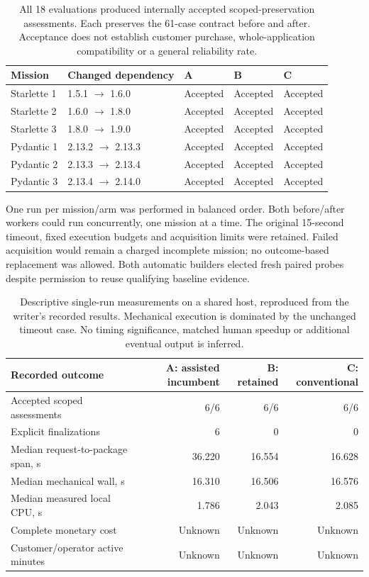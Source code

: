 \documentclass[11pt,letterpaper]{article}
\begin{document}
\begin{table}[ht]
\centering\small
\begin{tabularx}{\linewidth}{@{}lYlll@{}}
\toprule
Mission & Changed dependency & A & B & C\\\midrule
Starlette 1 & 1.5.1 $\to$ 1.6.0 & Accepted & Accepted & Accepted\\
Starlette 2 & 1.6.0 $\to$ 1.8.0 & Accepted & Accepted & Accepted\\
Starlette 3 & 1.8.0 $\to$ 1.9.0 & Accepted & Accepted & Accepted\\
Pydantic 1 & 2.13.2 $\to$ 2.13.3 & Accepted & Accepted & Accepted\\
Pydantic 2 & 2.13.3 $\to$ 2.13.4 & Accepted & Accepted & Accepted\\
Pydantic 3 & 2.13.4 $\to$ 2.14.0 & Accepted & Accepted & Accepted\\
\bottomrule
\end{tabularx}
\caption{All 18 evaluations produced internally accepted scoped-preservation assessments. Each preserves the 61-case contract before and after. Acceptance does not establish customer purchase, whole-application compatibility or a general reliability rate.}
\end{table}

One run per mission/arm was performed in balanced order. Both before/after workers could run concurrently, one mission at a time. The original 15-second timeout, fixed execution budgets and acquisition limits were retained. Failed acquisition would remain a charged incomplete mission; no outcome-based replacement was allowed. Both automatic builders elected fresh paired probes despite permission to reuse qualifying baseline evidence.

\begin{table}[ht]
\centering\small
\begin{tabularx}{\linewidth}{@{}Yrrr@{}}
\toprule
Recorded outcome & A: assisted incumbent & B: retained & C: conventional\\\midrule
Accepted scoped assessments & 6/6 & 6/6 & 6/6\\
Explicit finalizations & 6 & 0 & 0\\
Median request-to-package span, s & 36.220 & 16.554 & 16.628\\
Median mechanical wall, s & 16.310 & 16.506 & 16.576\\
Median measured local CPU, s & 1.786 & 2.043 & 2.085\\
Complete monetary cost & Unknown & Unknown & Unknown\\
Customer/operator active minutes & Unknown & Unknown & Unknown\\
\bottomrule
\end{tabularx}
\caption{Descriptive single-run measurements on a shared host, reproduced from the writer's recorded results. Mechanical execution is dominated by the unchanged timeout case. No timing significance, matched human speedup or additional eventual output is inferred.}
\end{table}
\end{document}
